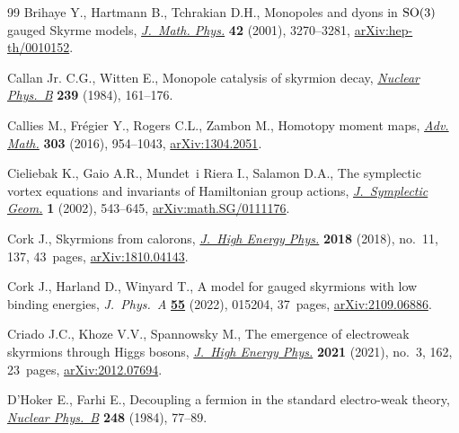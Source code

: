 \begin{thebibliography}{99}
Brihaye Y., Hartmann B., Tchrakian D.H., Monopoles and dyons in {${\rm SO}(3)$}
 gauged {S}kyrme models, \href{https://doi.org/10.1063/1.1380253}{\textit{J.~Math. Phys.}} \textbf{42} (2001),
 3270--3281, \href{https://arxiv.org/abs/hep-th/0010152}{arXiv:hep-th/0010152}.

Callan Jr. C.G., Witten E., Monopole catalysis of skyrmion decay,
 \href{https://doi.org/10.1016/0550-3213(84)90088-9}{\textit{Nuclear Phys.~B}} \textbf{239} (1984), 161--176.

Callies M., Fr\'egier Y., Rogers C.L., Zambon M., Homotopy moment maps,
 \href{https://doi.org/10.1016/j.aim.2016.08.012}{\textit{Adv. Math.}} \textbf{303} (2016), 954--1043, \href{https://arxiv.org/abs/1304.2051}{arXiv:1304.2051}.

Cieliebak K., Gaio A.R., Mundet~i Riera I., Salamon D.A., The symplectic vortex
 equations and invariants of {H}amiltonian group actions,
 \href{https://doi.org/10.4310/JSG.2001.v1.n3.a3}{\textit{J.~Symplectic Geom.}} \textbf{1} (2002), 543--645,
 \href{https://arxiv.org/abs/math.SG/0111176}{arXiv:math.SG/0111176}.

Cork J., Skyrmions from calorons, \href{https://doi.org/10.1007/jhep11(2018)137}{\textit{J.~High Energy Phys.}} \textbf{2018}
 (2018), no.~11, 137, 43~pages, \href{https://arxiv.org/abs/1810.04143}{arXiv:1810.04143}.

Cork J., Harland D., Winyard T., A model for gauged skyrmions with low binding
 energies, \textit{J.~Phys.~A} \href{https://doi.org/10.1088/1751-8121/ac3c81}{\textbf{55}} (2022), 015204, 37~pages,
 \href{https://arxiv.org/abs/2109.06886}{arXiv:2109.06886}.

Criado J.C., Khoze V.V., Spannowsky M., The emergence of electroweak skyrmions
 through {H}iggs bosons, \href{https://doi.org/10.1007/jhep03(2021)162}{\textit{J.~High Energy Phys.}} \textbf{2021} (2021),
 no.~3, 162, 23~pages, \href{https://arxiv.org/abs/2012.07694}{arXiv:2012.07694}.

D'Hoker E., Farhi E., Decoupling a fermion in the standard electro-weak theory,
 \href{https://doi.org/10.1016/0550-3213(84)90587-X}{\textit{Nuclear Phys.~B}} \textbf{248} (1984), 77--89.


\end{thebibliography}
